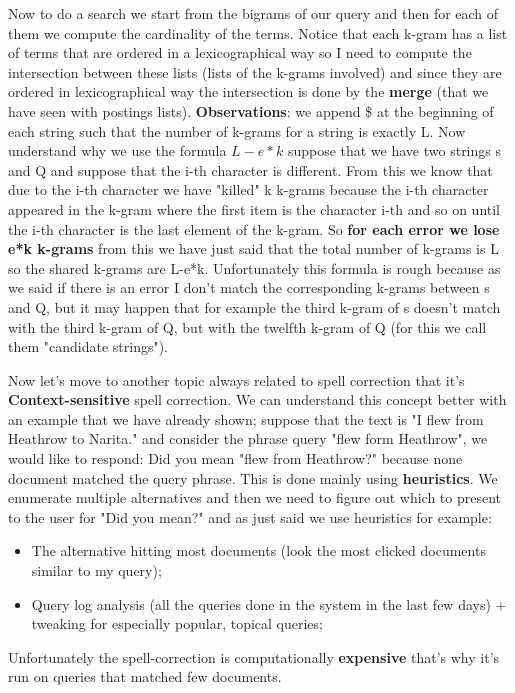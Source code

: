 Now to do a search we start from the bigrams of our query and then for each of them we compute the cardinality of the terms. Notice that each k-gram has a list of terms that are ordered in a lexicographical way so I need to compute the intersection between these lists (lists of the k-grams involved) and since they are ordered in lexicographical way the intersection is done by the \textbf{merge} (that we have seen with postings lists).\newline
\textbf{Observations}: we append \$ at the beginning of each string such that the number of k-grams for a string is exactly L. Now understand why we use the formula $L-e*k$ suppose that we have two strings s and Q and suppose that the i-th character is different. From this we know that due to the i-th character we have "killed" k k-grams because the i-th character appeared in the k-gram where the first item is the character i-th and so on until the i-th character is the last element of the k-gram. So \textbf{for each error we lose e*k k-grams} from this we have just said that the total number of k-grams is L so the shared k-grams are L-e*k. Unfortunately this formula is rough because as we said if there is an error I don't match the corresponding k-grams between s and Q, but it may happen that for example the third k-gram of s doesn't match with the third k-gram of Q, but with the twelfth k-gram of Q (for this we call them "candidate strings").\newline 


Now let's move to another topic always related to spell correction that it's \textbf{Context-sensitive} spell correction. We can understand this concept better with an example that we have already shown; suppose that the text is "I flew from Heathrow to Narita." and consider the phrase query "flew form Heathrow", we would like to respond: Did you mean "flew from Heathrow?" because none document matched the query phrase. This is done mainly using \textbf{heuristics}. \newline
We enumerate multiple alternatives and then we need to figure out which to present to the user for "Did you mean?" and as just said we use heuristics for example:
\begin{itemize}
    \item The alternative hitting most documents (look the most clicked documents similar to my query);
    \item Query log analysis (all the queries done in the system in the last few days) + tweaking for especially popular, topical queries;
\end{itemize}
Unfortunately the spell-correction is computationally \textbf{expensive} that's why it's run on queries that matched few documents.\newline


